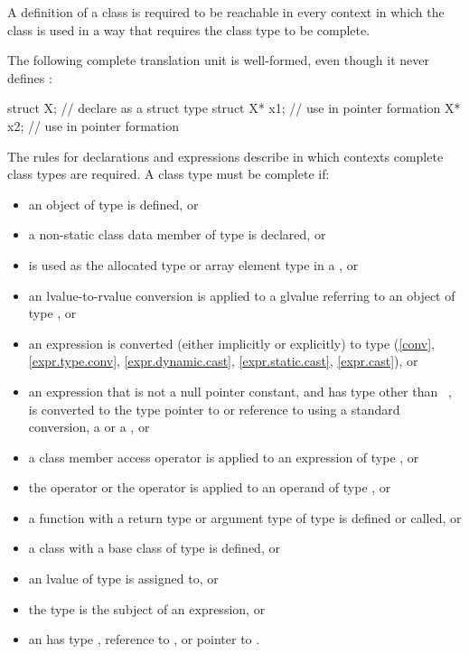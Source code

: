 \pnum
{}%
A definition of a class is required to be reachable in every context in which
the class is used in a way that requires the class type to be complete.
\begin{example} The following complete translation unit is well-formed,
even though it never defines :

\begin{codeblock}
struct X;                       // declare  as a struct type
struct X* x1;                   // use  in pointer formation
X* x2;                          // use  in pointer formation
\end{codeblock}
\end{example}
\begin{note} The rules for declarations and expressions
describe in which contexts complete class types are required. A class
type  must be complete if:
\begin{itemize}
\item an object of type  is defined, or
\item a non-static class data member of type  is
declared, or
\item {} is used as the allocated type or array element type in a
, or
\item an lvalue-to-rvalue conversion is applied to
a glvalue referring
to an object of type , or
\item an expression is converted (either implicitly or explicitly) to
type  (\ref{conv}, \ref{expr.type.conv},
\ref{expr.dynamic.cast}, \ref{expr.static.cast}, \ref{expr.cast}), or
\item an expression that is not a null pointer constant, and has type
other than \cv{}~, is converted to the type pointer to 
or reference to  using a standard conversion,
a  or
a , or
\item a class member access operator is applied to an expression of type
, or
\item the  operator or the
 operator is applied to an operand of
type , or
\item a function with a return type or argument type of type 
is defined or called, or
\item a class with a base class of type  is
defined, or
\item an lvalue of type  is assigned to, or
\item the type  is the subject of an
 expression, or
\item an  has type , reference to
, or pointer to .
\end{itemize}
\end{note}

